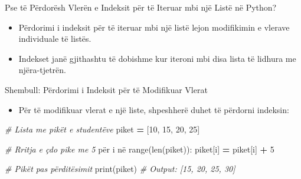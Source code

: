 \documentclass[
  ignorenonframetext,
]{beamer}
\newenvironment{Shaded}{\begin{snugshade}}{\end{snugshade}}
\newcommand{\BuiltInTok}[1]{#1}
\newcommand{\CommentTok}[1]{\textcolor[rgb]{0.56,0.35,0.01}{\textit{#1}}}
\newcommand{\DecValTok}[1]{\textcolor[rgb]{0.00,0.00,0.81}{#1}}
\newcommand{\NormalTok}[1]{#1}
\newcommand{\OperatorTok}[1]{\textcolor[rgb]{0.81,0.36,0.00}{\textbf{#1}}}
\providecommand{\tightlist}{%
  \setlength{\itemsep}{0pt}\setlength{\parskip}{0pt}}
\begin{document}
\begin{frame}{Pse të Përdorësh Vlerën e Indeksit për të Iteruar mbi një
Listë në Python?}
\protect\hypertarget{pse-tuxeb-puxebrdoruxebsh-vleruxebn-e-indeksit-puxebr-tuxeb-iteruar-mbi-njuxeb-listuxeb-nuxeb-python}{}
\begin{itemize}
\item
  Përdorimi i indeksit për të iteruar mbi një listë lejon modifikimin e
  vlerave individuale të listës.
\item
  Indekset janë gjithashtu të dobishme kur iteroni mbi disa lista të
  lidhura me njëra-tjetrën.
\end{itemize}
\end{frame}

\begin{frame}[fragile]{Shembull: Përdorimi i Indeksit për të Modifikuar
Vlerat}
\protect\hypertarget{shembull-puxebrdorimi-i-indeksit-puxebr-tuxeb-modifikuar-vlerat}{}
\begin{itemize}
\tightlist
\item
  Për të modifikuar vlerat e një liste, shpeshherë duhet të përdorni
  indeksin:
\end{itemize}

\begin{Shaded}
\begin{Highlighting}[]
\CommentTok{\# Lista me pikët e studentëve}
\NormalTok{piket }\OperatorTok{=}\NormalTok{ [}\DecValTok{10}\NormalTok{, }\DecValTok{15}\NormalTok{, }\DecValTok{20}\NormalTok{, }\DecValTok{25}\NormalTok{]}

\CommentTok{\# Rritja e çdo pike me 5}
\NormalTok{për i në }\BuiltInTok{range}\NormalTok{(}\BuiltInTok{len}\NormalTok{(piket)):}
\NormalTok{    piket[i] }\OperatorTok{=}\NormalTok{ piket[i] }\OperatorTok{+} \DecValTok{5}

\CommentTok{\# Pikët pas përditësimit}
\BuiltInTok{print}\NormalTok{(piket)  }\CommentTok{\# Output: [15, 20, 25, 30]}
\end{Highlighting}
\end{Shaded}
\end{frame}
\end{document}
